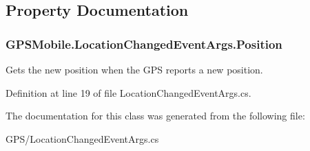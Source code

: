 \subsection{Property Documentation}
\hypertarget{class_g_p_s_mobile_1_1_location_changed_event_args_af8f0873f2d88ac2838080e44315ce790}{
\subsubsection[{Position}]{ GPSMobile.LocationChangedEventArgs.Position}}
\label{class_g_p_s_mobile_1_1_location_changed_event_args_af8f0873f2d88ac2838080e44315ce790}


Gets the new position when the GPS reports a new position. 

Definition at line 19 of file LocationChangedEventArgs.cs.

The documentation for this class was generated from the following file:\begin{DoxyCompactItemize}
\item 
GPS/LocationChangedEventArgs.cs\end{DoxyCompactItemize}
